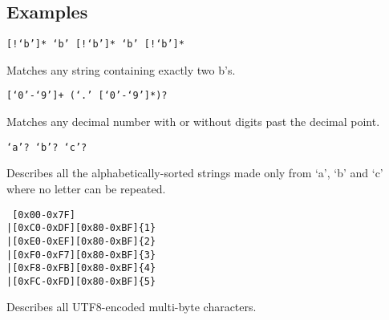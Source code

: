 
\subsection{Examples}
{
	\begin{itemize}
	{
		\item \texttt{[!{}`b']* `b' [!{}`b']* `b' [!{}`b']*}
		
			Matches any string containing exactly two b's.
		
		\item \texttt{[`0'-`9']+ (`.' [`0'-`9']*)?}
		
			Matches any decimal number with or without digits
			past the decimal point.
		
		\item \texttt{`a'? `b'? `c'?}
		
			Describes all the alphabetically-sorted strings made only
			from `a', `b' and `c' where no letter can be repeated.
		
		\item
\begin{lstlisting}
 [0x00-0x7F]
|[0xC0-0xDF][0x80-0xBF]{1}
|[0xE0-0xEF][0x80-0xBF]{2}
|[0xF0-0xF7][0x80-0xBF]{3}
|[0xF8-0xFB][0x80-0xBF]{4}
|[0xFC-0xFD][0x80-0xBF]{5}
\end{lstlisting}
			Describes all UTF8-encoded multi-byte characters.
	}
	\end{itemize}
}
